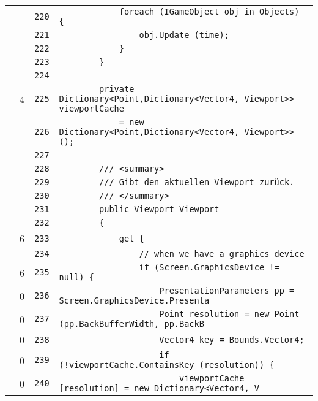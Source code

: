\documentclass[a4paper,10pt]{article}
\begin{document}
\begin{longtable}[l]{lrrl}
\cellcolor{gray} &  & \verb~220~ & \verb~            foreach (IGameObject obj in Objects) {~\\
\cellcolor{gray} &  & \verb~221~ & \verb~                obj.Update (time);~\\
\cellcolor{gray} &  & \verb~222~ & \verb~            }~\\
\cellcolor{gray} &  & \verb~223~ & \verb~        }~\\
\cellcolor{gray} &  & \verb~224~ & \verb~~\\
\cellcolor{green} & 4 & \verb~225~ & \verb~        private Dictionary<Point,Dictionary<Vector4, Viewport>> viewportCache~\\
\cellcolor{gray} &  & \verb~226~ & \verb~            = new Dictionary<Point,Dictionary<Vector4, Viewport>> ();~\\
\cellcolor{gray} &  & \verb~227~ & \verb~~\\
\cellcolor{gray} &  & \verb~228~ & \verb~        /// <summary>~\\
\cellcolor{gray} &  & \verb~229~ & \verb~        /// Gibt den aktuellen Viewport zurück.~\\
\cellcolor{gray} &  & \verb~230~ & \verb~        /// </summary>~\\
\cellcolor{gray} &  & \verb~231~ & \verb~        public Viewport Viewport~\\
\cellcolor{gray} &  & \verb~232~ & \verb~        {~\\
\cellcolor{green} & 6 & \verb~233~ & \verb~            get {~\\
\cellcolor{gray} &  & \verb~234~ & \verb~                // when we have a graphics device~\\
\cellcolor{green} & 6 & \verb~235~ & \verb~                if (Screen.GraphicsDevice != null) {~\\
\cellcolor{red} & 0 & \verb~236~ & \verb~                    PresentationParameters pp = Screen.GraphicsDevice.Presenta~\\
\cellcolor{red} & 0 & \verb~237~ & \verb~                    Point resolution = new Point (pp.BackBufferWidth, pp.BackB~\\
\cellcolor{red} & 0 & \verb~238~ & \verb~                    Vector4 key = Bounds.Vector4;~\\
\cellcolor{red} & 0 & \verb~239~ & \verb~                    if (!viewportCache.ContainsKey (resolution)) {~\\
\cellcolor{red} & 0 & \verb~240~ & \verb~                        viewportCache [resolution] = new Dictionary<Vector4, V~\\

\end{longtable}
\end{document}
